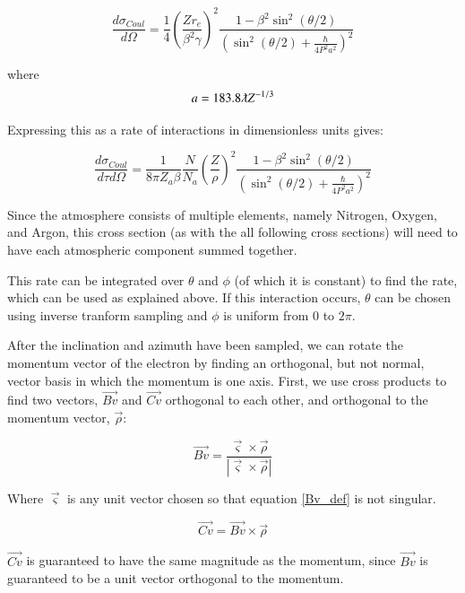 \documentclass[]{article}
\begin{document}
\begin{equation} 
\frac{d\sigma_{Coul}}{d \Omega} = \frac{1}{4}\left(  \frac{Z r_e }{\beta^2 \gamma }  \right)^2\frac{1-\beta^2\sin^2(\theta/2)}{ \left(  \sin^2(\theta/2) + \frac{\hbar}{4P^2a^2}  \right)^2 }
\end{equation}

where
\begin{equation} 
a=183.8 \lambdabar Z^{-1/3}
\end{equation}

Expressing this as a rate of interactions in dimensionless units gives:

\begin{equation} 
\frac{d\sigma_{Coul}}{d\tau d\Omega} = \frac{1}{8\pi Z_a \beta}  \frac{N}{N_a} \left( \frac{Z }{\rho}  \right)^2\frac{1-\beta^2\sin^2(\theta/2)}{ \left(  \sin^2(\theta/2) + \frac{\hbar}{4P^2a^2}  \right)^2 }
\end{equation}

Since the atmosphere consists of multiple elements,  namely Nitrogen, Oxygen, and Argon, this cross section (as with the all following cross sections) will need to have each atmospheric component summed together.  

This rate can be integrated over $\theta$ and $\phi$ (of which it is constant) to find the rate, which can be used as explained above. If this interaction occurs, $\theta$ can be chosen using inverse tranform sampling and $\phi$ is uniform from 0 to $2\pi$.

After the inclination and azimuth have been sampled, we can rotate the momentum vector of the electron by finding an orthogonal, but not normal, vector basis in which the momentum is one axis. First, we use cross products to find two vectors, $\vec{Bv}$ and $\vec{Cv}$ orthogonal to each other, and orthogonal to the momentum vector, $\vec{\rho}$:

\begin{equation}
\label{Bv_def}
\vec{Bv}=\frac{\vec{\varsigma}\times \vec{\rho}}{ \left| \vec{\varsigma}\times \vec{\rho}  \right|   }
\end{equation}

Where $\vec{\varsigma}$ is any unit vector chosen so that equation \ref{Bv_def} is not singular.

\begin{equation}
\vec{Cv}=\vec{Bv}\times \vec{\rho}
\end{equation}

$\vec{Cv}$ is guaranteed to have the same magnitude as the momentum, since $\vec{Bv}$ is guaranteed to be a unit vector orthogonal to the momentum.
\end{document}
